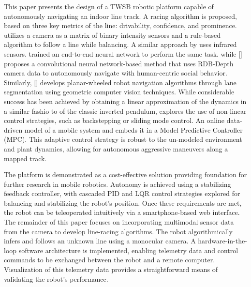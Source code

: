     This paper presents the design of a TWSB robotic platform capable of autonomously navigating an 
    indoor line track. A racing algorithm is proposed,
    based on three key metrics of the line: drivability, confidence, and prominence.
    \cite{visionlinetwsb} utilizes a camera as a matrix of binary intensity sensors and a rule-based 
    algorithm to follow a line while balancing. A similar approach by \cite{ghani2011two} uses infrared sensors. 
    \cite{nntwsbvision} trained an end-to-end neural network to perform the same task. while [] proposes a 
    convolutional neural network-based method that uses RDB-Depth camera data to autonomously 
    navigate with human-centric social behavior. Similarly, [] develops planar-wheeled robot navigation 
    algorithms through lane segmentation using geometric computer vision techniques.
    While considerable success has been achieved by obtaining a linear approximation of the dynamics in a similar fashio to 
    of the classic inverted pendulum, \cite{AdvancedWIP} explores the use of non-linear control strategies, such as backstepping or 
    sliding mode control. An online data-driven model of a mobile system and embeds it 
    in a Model Predictive Controller (MPC). This adaptive control strategy is robust to the un-modeled 
    environment and plant dynamics, allowing for autonomous aggressive maneuvers along a mapped track.
    
    The platform is demonstrated as a cost-effective solution providing foundation for further research in mobile robotics.
    Autonomy is achieved using a stabilizing feedback controller, with cascaded PID and 
    LQR control strategies explored for balancing and stabilizing the robot's position. 
    Once these requirements are met, the robot can be teleoperated intuitively via a 
    smartphone-based web interface. The remainder of this paper focuses on incorporating 
    multimodal sensor data from the camera to develop line-racing algorithms.
    The robot algorithmically infers and follows an unknown line using a monocular camera. 
    A hardware-in-the-loop software architecture is implemented, enabling telemetry data and control 
    commands to be exchanged between the robot and a remote computer. Visualization of this telemetry
    data provides a straightforward means of validating the robot's performance.
    \pagebreak{}

